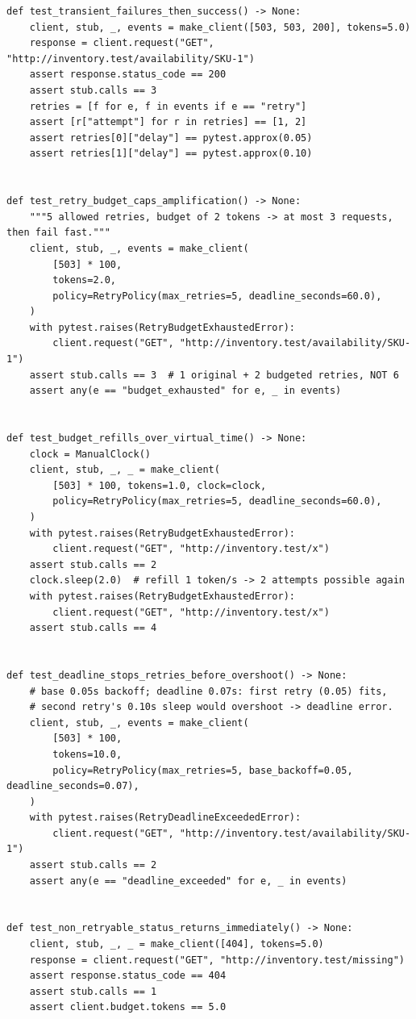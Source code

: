 \begin{verbatim}
def test_transient_failures_then_success() -> None:
    client, stub, _, events = make_client([503, 503, 200], tokens=5.0)
    response = client.request("GET", "http://inventory.test/availability/SKU-1")
    assert response.status_code == 200
    assert stub.calls == 3
    retries = [f for e, f in events if e == "retry"]
    assert [r["attempt"] for r in retries] == [1, 2]
    assert retries[0]["delay"] == pytest.approx(0.05)
    assert retries[1]["delay"] == pytest.approx(0.10)


def test_retry_budget_caps_amplification() -> None:
    """5 allowed retries, budget of 2 tokens -> at most 3 requests, then fail fast."""
    client, stub, _, events = make_client(
        [503] * 100,
        tokens=2.0,
        policy=RetryPolicy(max_retries=5, deadline_seconds=60.0),
    )
    with pytest.raises(RetryBudgetExhaustedError):
        client.request("GET", "http://inventory.test/availability/SKU-1")
    assert stub.calls == 3  # 1 original + 2 budgeted retries, NOT 6
    assert any(e == "budget_exhausted" for e, _ in events)


def test_budget_refills_over_virtual_time() -> None:
    clock = ManualClock()
    client, stub, _, _ = make_client(
        [503] * 100, tokens=1.0, clock=clock,
        policy=RetryPolicy(max_retries=5, deadline_seconds=60.0),
    )
    with pytest.raises(RetryBudgetExhaustedError):
        client.request("GET", "http://inventory.test/x")
    assert stub.calls == 2
    clock.sleep(2.0)  # refill 1 token/s -> 2 attempts possible again
    with pytest.raises(RetryBudgetExhaustedError):
        client.request("GET", "http://inventory.test/x")
    assert stub.calls == 4


def test_deadline_stops_retries_before_overshoot() -> None:
    # base 0.05s backoff; deadline 0.07s: first retry (0.05) fits,
    # second retry's 0.10s sleep would overshoot -> deadline error.
    client, stub, _, events = make_client(
        [503] * 100,
        tokens=10.0,
        policy=RetryPolicy(max_retries=5, base_backoff=0.05, deadline_seconds=0.07),
    )
    with pytest.raises(RetryDeadlineExceededError):
        client.request("GET", "http://inventory.test/availability/SKU-1")
    assert stub.calls == 2
    assert any(e == "deadline_exceeded" for e, _ in events)


def test_non_retryable_status_returns_immediately() -> None:
    client, stub, _, _ = make_client([404], tokens=5.0)
    response = client.request("GET", "http://inventory.test/missing")
    assert response.status_code == 404
    assert stub.calls == 1
    assert client.budget.tokens == 5.0



\end{verbatim}
